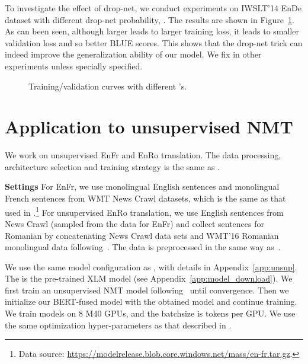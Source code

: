 \documentclass{article} \usepackage{iclr2020_conference,times}
\begin{document}
To investigate the effect of drop-net, we  conduct experiments on IWSLT'14 EnDe dataset with different drop-net probability, . The results are shown in Figure~\ref{fig:study_of_dropnet}. As can been seen, although larger  leads to larger training loss, it leads to smaller validation loss and so better BLUE scores. This shows that the drop-net trick can indeed improve the generalization ability of our model. We fix  in other experiments unless specially specified. 
\begin{figure}[!htpb]
\centering
\begin{minipage}{0.33\linewidth}
\end{minipage}\begin{minipage}{0.33\linewidth}
\end{minipage}\begin{minipage}{0.33\linewidth}
\end{minipage}
\caption{Training/validation curves with different 's.}
\label{fig:study_of_dropnet}
\end{figure}



\section{Application to unsupervised NMT}\label{sec:unsupervised_nmt}
We work on unsupervised EnFr and EnRo translation. The data processing, architecture selection and training strategy is the same as \cite{lample2019cross}.

\noindent\textbf{Settings} For EnFr, we use  monolingual English sentences and  monolingual French sentences from WMT
News Crawl datasets, which is the same as that used in \citep{song2019mass}.\footnote{Data source: \url{https://modelrelease.blob.core.windows.net/mass/en-fr.tar.gz}.} For unsupervised EnRo translation, we use  English sentences from News Crawl (sampled from the data for EnFr) and collect  sentences for Romanian by concatenating News Crawl data sets and WMT'16 Romanian monolingual data following~\citet{lample2018phrase}. The data is preprocessed in the same way as~\citet{lample2019cross}. 

We use the same model configuration as \cite{lample2019cross}, with details in Appendix~\ref{app:unsup}. The  is  the pre-trained XLM model (see Appendix~\ref{app:model_download}). We first train an unsupervised NMT model following~\citet{lample2019cross} until convergence. Then we initialize our BERT-fused  model with the obtained model and continue training. We train models on 8 M40 GPUs, and the batchsize is  tokens per GPU. We use the same optimization hyper-parameters as that described in \citet{lample2019cross}.
\end{document}
